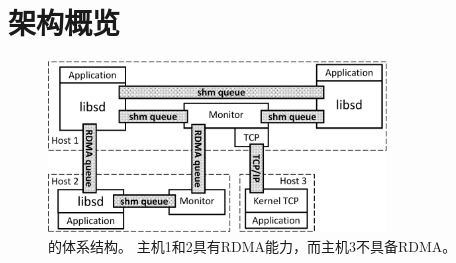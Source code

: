 \section{架构概览}
\label{socksdirect:sec:architecture}


\begin{figure}[htbp]
	\centering
	\includegraphics[width=0.8\textwidth]{images/architecture_new}
	
	\caption{\sys {}的体系结构。 主机1和2具有RDMA能力，而主机3不具备RDMA。}
	\label{socksdirect:fig:architecture}
	\vspace{5pt}
\end{figure}


